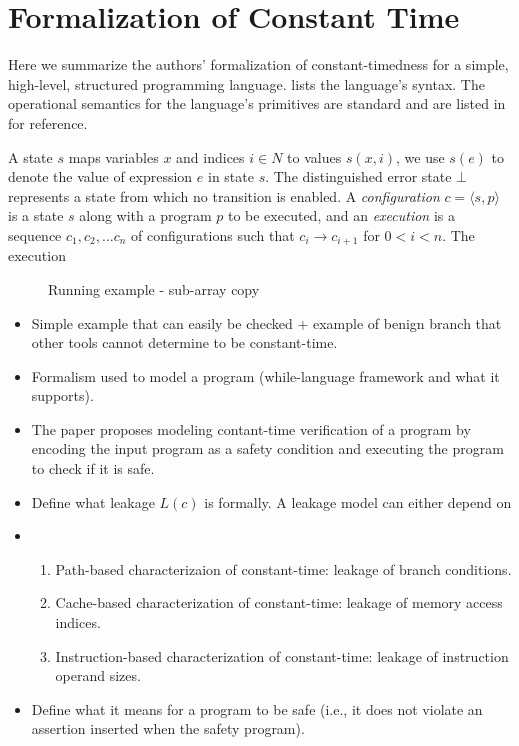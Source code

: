\section{Formalization of Constant Time}
\label{sec:prelimnaries}


Here we summarize the authors' formalization of constant-timedness for a simple, high-level, structured programming language. 
 lists the language's syntax. 
The operational semantics for the language's primitives are standard and are listed in  for reference.

A state $s$ maps variables $x$ and indices $i \in N$ to values $s(x,i)$, we use $s(e)$ to denote the value of expression $e$ in state $s$. 
The distinguished error state $\bot$ represents a state from which no transition is enabled. A \emph{configuration} $c = \langle s,p \rangle$ is a state $s$ along with a program $p$ to be executed, and an \emph{execution} is a sequence $c_{1},c_{2},...c_{n}$ of configurations such that  $c_{i} \to c_{i+1}$ for $0<i<n$. The execution




\begin{figure}[t]
  
  \caption{Running example - sub-array copy}
  \label{fig:example}
\end{figure}

\begin{itemize}
  \item Simple example that can easily be checked + example of benign branch that other tools cannot determine to be constant-time.
  \item Formalism used to model a program (while-language framework and what it supports).
  \item The paper proposes modeling contant-time verification of a program by encoding the input program as a safety condition and executing the program to check if it is safe.
  \item Define what leakage $L(c)$ is formally. A leakage model can either depend on
        \item \begin{enumerate}
          \item Path-based characterizaion of constant-time: leakage of branch conditions.
          \item Cache-based characterization of constant-time: leakage of memory access indices.
          \item Instruction-based characterization of constant-time: leakage of instruction operand sizes.
        \end{enumerate}
  \item Define what it means for a program to be safe (i.e., it does not violate an assertion inserted when the safety program).
\end{itemize}
